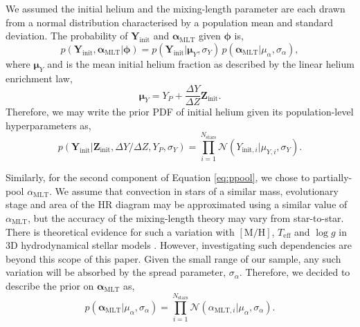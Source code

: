 \documentclass[a4paper,fleqn,usenatbib]{mnras}
\newcommand{\metallicity}{\ensuremath{[\mathrm{M}/\mathrm{H}]}}
\newcommand{\teff}{\ensuremath{T_\mathrm{eff}}}
\newcommand{\mlt}{\ensuremath{{\alpha_\mathrm{MLT}}}}
\begin{document}
We assumed the initial helium and the mixing-length parameter are each drawn from a normal distribution characterised by a population mean and standard deviation. The probability of $\boldsymbol{Y}_\mathrm{init}$ and $\boldsymbol{\alpha}_\mathrm{MLT}$ given $\boldsymbol{\phi}$ is,
%
\begin{equation}
    p(\boldsymbol{Y}_\mathrm{init}, \boldsymbol{\alpha}_\mathrm{MLT} | \boldsymbol{\phi}) = p(\boldsymbol{Y}_\mathrm{init} | \boldsymbol{\mu}_Y, \sigma_Y) \, p(\boldsymbol{\alpha}_\mathrm{MLT} | \mu_\alpha, \sigma_\alpha),
    \label{eq:ppool}
\end{equation}
%
where $\boldsymbol{\mu}_Y$ and is the mean initial helium fraction as described by the linear helium enrichment law,
%
\begin{equation}
    \boldsymbol{\mu}_{Y} = Y_P + \frac{\Delta Y}{\Delta Z} \boldsymbol{Z}_{\mathrm{init}}.\label{eq:helium}
\end{equation}
%
Therefore, we may write the prior PDF of initial helium given its population-level hyperparameters as,
%
\begin{equation}
    p(\boldsymbol{Y}_{\mathrm{init}} | \boldsymbol{Z}_{\mathrm{init}}, {\Delta Y}/{\Delta Z}, Y_P, \sigma_Y) = \prod_{i=1}^{N_\mathrm{stars}} \mathcal{N}({Y}_{\mathrm{init}, i} | {\mu}_{Y, i}, \sigma_Y).
\end{equation}
%

Similarly, for the second component of Equation \ref{eq:ppool}, we chose to partially-pool $\mlt$. We assume that convection in stars of a similar mass, evolutionary stage and area of the HR diagram may be approximated using a similar value of $\mlt$, but the accuracy of the mixing-length theory may vary from star-to-star. There is theoretical evidence for such a variation with $\metallicity$, $\teff$ and $\log{g}$ in 3D hydrodynamical stellar models \citep{Magic.Weiss.ea2015,Viani.Basu.ea2018}. However, investigating such dependencies are beyond this scope of this paper. Given the small range of our sample, any such variation will be absorbed by the spread parameter, $\sigma_\alpha$. Therefore, we decided to describe the prior on $\boldsymbol{\alpha}_\mathrm{MLT}$ as,
%
\begin{equation}
    p(\boldsymbol{\alpha}_{\mathrm{MLT}} | \mu_\alpha, \sigma_\alpha) = \prod_{i=1}^{N_\mathrm{stars}} \mathcal{N}({\alpha}_{\mathrm{MLT}, i} | \mu_\alpha, \sigma_\alpha).
\end{equation}
%
\end{document}
